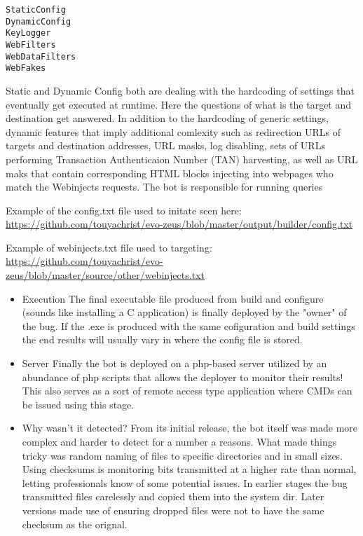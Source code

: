 \begin{verbatim}
StaticConfig 
DynamicConfig
KeyLogger
WebFilters
WebDataFilters
WebFakes
\end{verbatim}

Static and Dynamic Config both are dealing with the hardcoding of
settings that eventually get executed at runtime. Here the questions of
what is the target and destination get answered. In addition to the
hardcoding of generic settings, dynamic features that imply additional
comlexity such as redirection URLs of targets and destination addresses,
URL masks, log disabling, sets of URLs performing Transaction
Authenticaion Number (TAN) harvesting, as well as URL maks that contain
corresponding HTML blocks injecting into webpages who match the
Webinjects requests. The bot is responsible for running queries

Example of the config.txt file used to initate seen here:
\href{https://github.com/touyachrist/evo-zeus/blob/master/output/builder/config.txt}{https://github.com/touyachrist/evo-zeus/blob/master/output/builder/config.txt}

Example of webinjects.txt file used to targeting:
\href{https://github.com/touyachrist/evo-zeus/blob/master/source/other/webinjects.txt}{https://github.com/touyachrist/evo-zeus/blob/master/source/other/webinjects.txt}

\begin{itemize}
\item
  Execution The final executable file produced from build and configure
  (sounds like installing a C application) is finally deployed by the
  "owner" of the bug. If the .exe is produced with the same cofiguration
  and build settings the end results will usually vary in where the
  config file is stored.
\item
  Server Finally the bot is deployed on a php-based server utilized by
  an abundance of php scripts that allows the deployer to monitor their
  results! This also serves as a sort of remote access type application
  where CMDs can be issued using this stage.
\item
  Why wasn't it detected? From its initial release, the bot itself was
  made more complex and harder to detect for a number a reasons. What
  made things tricky was random naming of files to specific directories
  and in small sizes. Using checksums is monitoring bits transmitted at
  a higher rate than normal, letting professionals know of some
  potential issues. In earlier stages the bug transmitted files
  carelessly and copied them into the system dir. Later versions made
  use of ensuring dropped files were not to have the same checksum as
  the orignal.
\end{itemize}

